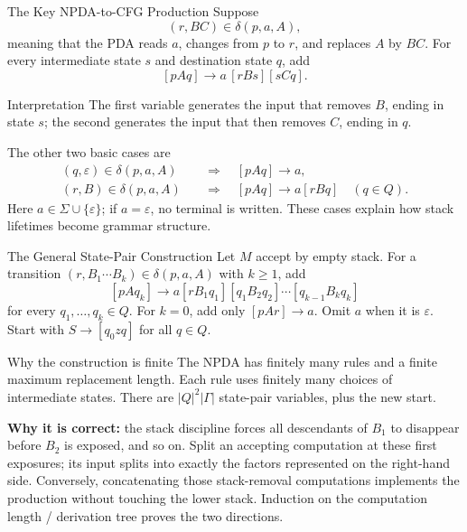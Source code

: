 \documentclass[10pt]{beamer}
\begin{document}
\begin{frame}{The Key NPDA-to-CFG Production}
  \small
  Suppose
  \[
    (r,BC)\in\delta(p,a,A),
  \]
  \pause
  meaning that the PDA reads $a$, changes from $p$ to $r$, and replaces $A$ by $BC$.
  For every intermediate state $s$ and destination state $q$, add
  \[
    [pAq]\to a\,[rBs][sCq].
  \]
  \pause
  \begin{block}{Interpretation}
    The first variable generates the input that removes $B$, ending in state $s$; the second generates
    the input that then removes $C$, ending in $q$.
  \end{block}
  The other two basic cases are
  \[
    \begin{aligned}
      (q,\varepsilon)\in\delta(p,a,A)&\quad\Rightarrow\quad[pAq]\to a,\\
      (r,B)\in\delta(p,a,A)&\quad\Rightarrow\quad[pAq]\to a[rBq]
        \quad(q\in Q).
    \end{aligned}
  \]
  Here $a\in\Sigma\cup\{\varepsilon\}$; if $a=\varepsilon$, no terminal
  is written. These cases explain how stack lifetimes become grammar structure.
\end{frame}

\begin{frame}{The General State-Pair Construction}
  \small
  Let $M$ accept by empty stack. For a transition
  $(r,B_1\cdots B_k)\in\delta(p,a,A)$ with $k\ge1$, add
  \[
    [pAq_k]\to a[rB_1q_1][q_1B_2q_2]\cdots[q_{k-1}B_kq_k]
  \]
  for every $q_1,\ldots,q_k\in Q$.
  For $k=0$, add only $[pAr]\to a$. Omit $a$ when it is $\varepsilon$.
  Start with $S\to[q_0zq]$ for all $q\in Q$.
  \pause
  \begin{block}{Why the construction is finite}
    The NPDA has finitely many rules and a finite maximum replacement
    length. Each rule uses finitely many choices of intermediate states.
    There are $|Q|^2|\Gamma|$ state-pair variables, plus the new start.
  \end{block}
  \pause
  \textbf{Why it is correct:} the stack discipline forces all descendants
  of $B_1$ to disappear before $B_2$ is exposed, and so on. Split an
  accepting computation at these first exposures; its input splits into
  exactly the factors represented on the right-hand side.
  Conversely, concatenating those stack-removal computations implements
  the production without touching the lower stack. Induction on the
  computation length / derivation tree proves the two directions.
\end{frame}
\end{document}
